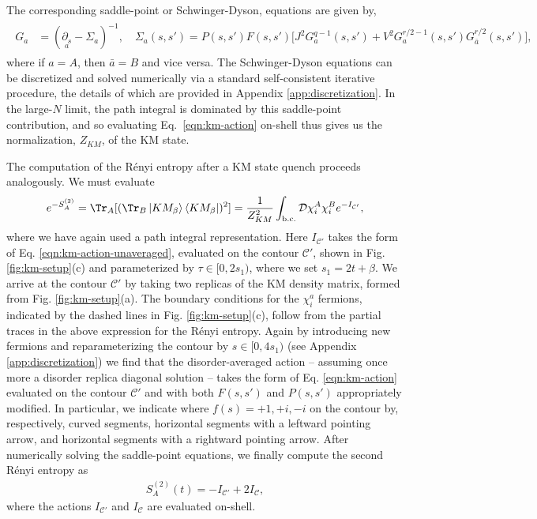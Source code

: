 \documentclass[reprint, floatfix,eqsecnum,superscriptaddress,preprint,nofootinbib,onecolumn,amsmath,amssymb,aps,prb]{revtex4-2}
\begin{document}
The corresponding saddle-point or Schwinger-Dyson, equations are given by,
\begin{align}
    \begin{split}
	G_a &= (\underset{a}{\partial_s} - \Sigma_{a})^{-1} , \quad
	\Sigma_a(s,s') = P(s,s')F(s,s') \Big[J^2 G_a^{q-1}(s,s') + V^2 G_a^{r/2-1}(s,s') G_{\bar{a}}^{r/2}(s,s')\Big] , \label{eqn:km-sd-eqns}
	\end{split}
\end{align}
where if $a=A$, then $\bar{a}=B$ and vice versa.
The Schwinger-Dyson equations can be discretized and solved numerically via a standard self-consistent iterative procedure, the details of which are provided in Appendix \ref{app:discretization}. 
In the large-$N$ limit, the path integral is dominated by this saddle-point contribution, and so evaluating Eq.~\eqref{eqn:km-action} on-shell thus gives us the normalization, $Z_{KM}$, of the KM state.

The computation of the R\'enyi entropy after a KM state quench proceeds analogously. We must evaluate 
\begin{align}
    e^{-S^{(2)}_A} = \Tr_A [( \Tr_B \ket{KM_\beta}\bra{KM_\beta})^2 ]=
	\frac{1}{Z_{KM}^2} \int_{\mathrm{b.c.}} \mathcal{D}\chi_i^A \chi_i^B e^{- I_{\mathcal{C}'} }, \label{eqn:km-trace}
\end{align}
where we have again used a path integral representation. Here $I_{\mathcal{C'}}$ takes the form of Eq. \eqref{eqn:km-action-unaveraged}, evaluated on the contour $\mathcal{C}'$, shown in Fig. \ref{fig:km-setup}(c) and parameterized by $\tau \in [0,2s_1)$, where we set $s_1 = 2t+\beta$. We arrive at the contour $\mathcal{C}'$ by taking two replicas of the KM density matrix, formed from Fig. \ref{fig:km-setup}(a). The boundary conditions for the $\chi^{a}_i$ fermions, indicated by the dashed lines in Fig. \ref{fig:km-setup}(c), follow from the partial traces in the above expression for the R\'enyi entropy. Again by introducing new fermions and reparameterizing the contour by $s \in [0,4s_1)$ (see Appendix \ref{app:discretization}) we find that the disorder-averaged action -- assuming once more a disorder replica diagonal solution -- takes the form of Eq. \eqref{eqn:km-action} evaluated on the contour $\mathcal{C}'$  and with both $F(s,s')$ and $P(s,s')$ appropriately modified. 
In particular, we indicate where $f(s) = +1, +i, -i$ on the contour by, respectively, curved segments, horizontal segments with a leftward pointing arrow, and horizontal segments with a rightward pointing arrow.
After numerically solving the saddle-point equations, we finally compute the second R\'enyi entropy as
\begin{align}
    S^{(2)}_A(t) = - I_{\mathcal{C}'} + 2I_{\mathcal{C}},
\end{align}
where the actions $I_{\mathcal{C}'}$ and $I_{\mathcal{C}}$ are evaluated on-shell. %
\end{document}
